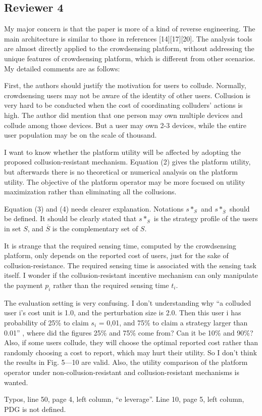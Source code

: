 \documentclass[a4paper,11pt]{exam}
\begin{document}
\begin{questions}
\section{Reviewer 4}
\question My major concern is that the paper is more of a kind of reverse engineering. The main architecture is similar to those in references [14][17][20]. The analysis tools are almost directly applied to the crowdsensing platform, without addressing the unique features of crowdsensing platform, which is different from other scenarios. My detailed comments are as follows:

\question First, the authors should justify the motivation for users to collude. Normally, crowdsensing users may not be aware of the identity of other users. Collusion is very hard to be conducted when the cost of coordinating colluders’ actions is high. The author did mention that one person may own multiple devices and collude among those devices. But a user may own 2-3 devices, while the entire user population may be on the scale of thousand. 

\question I want to know whether the platform utility will be affected by adopting the proposed collusion-resistant mechanism. Equation (2) gives the platform utility, but afterwards there is no theoretical or numerical analysis on the platform utility. The objective of the platform operator may be more focused on utility maximization rather than eliminating all the collusions.

\question Equation (3) and (4) needs clearer explanation. Notations $s*_S$ and $s*_{\overline{S}}$ should be defined. It should be clearly stated that $s*_S$ is the strategy profile of the users in set $S$, and $\overline{S}$ is the complementary set of $S$. 

\question It is strange that the required sensing time, computed by the crowdsensing platform, only depends on the reported cost of users, just for the sake of collusion-resistance. The required sensing time is associated with the sensing task itself. I wonder if the collusion-resistant incentive mechanism can only manipulate the payment $p_i$ rather than the required sensing time $t_i$. 

\question The evaluation setting is very confusing. I don’t understanding why “a colluded user i’s cost unit is 1.0, and the perturbation size is 2.0. Then this user i has probability of 25\% to claim $s_i$ = 0,01, and 75\% to claim a strategy larger than 0.01” , where did the figures 25\% and 75\% come from? Can it be 10\% and 90\%? Also, if some users collude, they will choose the optimal reported cost rather than randomly choosing a cost to report, which may hurt their utility.  So I don’t think the results in Fig. 5---10 are valid. Also, the utility comparison of the platform operator under non-collusion-resistant and collusion-resistant mechanisms is wanted. 

\question Typos, line 50, page 4, left column, “e leverage”. Line 10, page 5, left column, PDG is not defined.
\end{questions}
\end{document}
